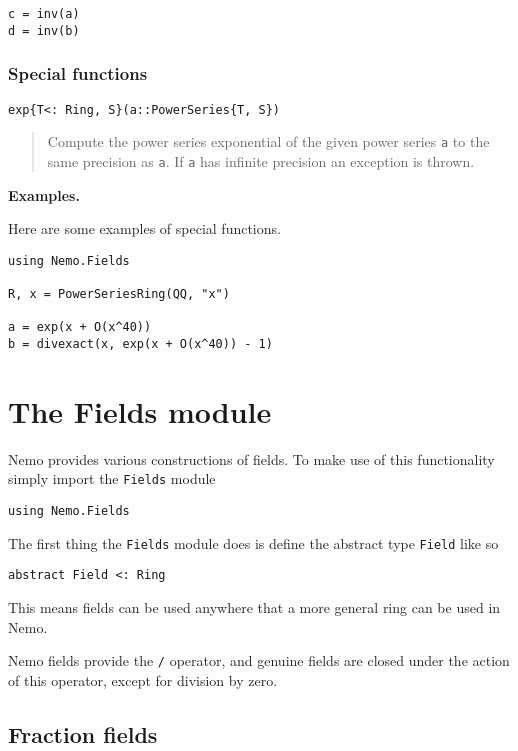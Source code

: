 \documentclass[a4paper,10pt]{article}
\newcommand{\code}{\lstinline}
\newcommand{\desc}[1]{\vspace{-3mm}\begin{quote}#1\end{quote}}
\begin{document}
{{\begin{lstlisting}
c = inv(a)
d = inv(b)
\end{lstlisting}

\subsubsection{Special functions}

\begin{lstlisting}
exp{T<: Ring, S}(a::PowerSeries{T, S})
\end{lstlisting}

\desc{Compute the power series exponential of the given power series \code{a}
to the same precision as \code{a}. If \code{a} has infinite precision an
exception is thrown.}

\textbf{Examples.}

Here are some examples of special functions.

\begin{lstlisting}
using Nemo.Fields

R, x = PowerSeriesRing(QQ, "x")

a = exp(x + O(x^40))
b = divexact(x, exp(x + O(x^40)) - 1)
\end{lstlisting}

\section{The Fields module}

Nemo provides various constructions of fields. To make use of this 
functionality simply import the \code{Fields} module

\begin{lstlisting}
using Nemo.Fields
\end{lstlisting}

The first thing the \code{Fields} module does is define the abstract
type \code{Field} like so

\begin{lstlisting}
abstract Field <: Ring
\end{lstlisting}

This means fields can be used anywhere that a more general ring can be used
in Nemo.

Nemo fields provide the \code{/} operator, and genuine fields are closed under
the action of this operator, except for division by zero.

\subsection{Fraction fields}

}}
\end{document}
